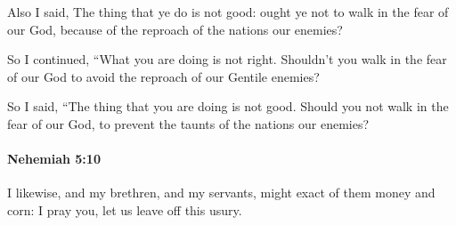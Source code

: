 			\begin{versebox}
					\item[BHS] 
					\item[LXX] 
					\item[ASV] Also I said, The thing that ye do is not good: ought ye not to walk in the fear of our God, because of the reproach of the nations our enemies?
					\item[NIV] So I continued, “What you are doing is not right. Shouldn’t you walk in the fear of our God to avoid the reproach of our Gentile enemies?
					\item[NRSV] So I said, “The thing that you are doing is not good. Should you not walk in the fear of our God, to prevent the taunts of the nations our enemies?
			\end{versebox}

		\paragraph{Nehemiah 5:10} %
			\label{NEHEMIAH-5-10}

			I likewise, and my brethren, and my servants, might exact of them money and corn: I pray you, let us leave off this usury.

